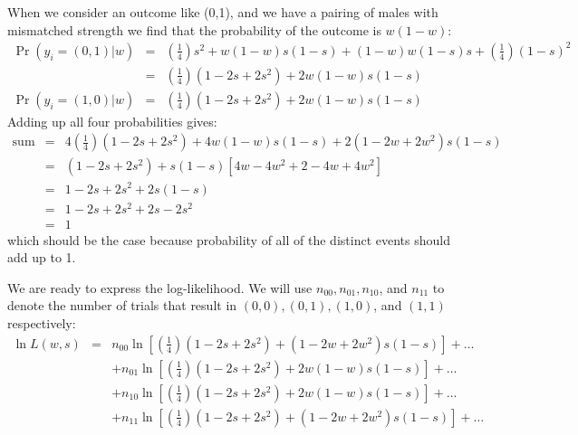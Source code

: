 \documentclass[11pt]{article}
\begin{document}
When we consider an outcome like (0,1), and we have a pairing of males with mismatched strength we find that the probability of the outcome is $w(1-w)$:
\begin{eqnarray*} 
 \Pr(y_i = (0,1)|w)  & = &   \left(\frac{1}{4}\right)s^2 + w(1-w) s(1-s)  + (1-w)w(1-s)s + \left(\frac{1}{4}\right)(1-s)^2 \\
	 & = &   \left(\frac{1}{4}\right)(1-2s +2s^2) + 2w(1-w) s(1-s) \\
\Pr(y_i = (1,0)|w)  & = &\left(\frac{1}{4}\right)(1-2s +2s^2) + 2w(1-w) s(1-s)
\end{eqnarray*}
Adding up all four probabilities gives:
\begin{eqnarray*} 
\mbox{sum} & = & 4\left(\frac{1}{4}\right)(1-2s +2s^2) + 4w(1-w) s(1-s) + 2 (1 -2w +2w^2) s(1-s)\\
& = & (1-2s +2s^2) + s(1-s)\left[4w -4w^2 + 2 -4w +4w^2\right]\\
& = & 1-2s +2s^2 + 2s(1-s)\\
& = & 1-2s +2s^2 + 2s- 2s^2\\
& = & 1
\end{eqnarray*}
which should be the case because probability of all of the distinct events should add up to 1.

We are ready to express the log-likelihood. We will use $n_{00}, n_{01}, n_{10}$, and $n_{11}$ to denote the number of trials that result in $(0,0), (0,1), (1,0)$, and $(1,1)$ respectively:
\begin{eqnarray*} 
\ln L(w,s) & = & n_{00}\ln\left[\left(\frac{1}{4}\right)(1-2s +2s^2) + (1 -2w +2w^2) s(1-s)\right] + \ldots \\
	& & +  n_{01}\ln\left[\left(\frac{1}{4}\right)(1-2s +2s^2) + 2w(1-w) s(1-s)\right] + \ldots \\
	& & +  n_{10}\ln\left[\left(\frac{1}{4}\right)(1-2s +2s^2) + 2w(1-w) s(1-s)\right] + \ldots \\
	& & + n_{11}\ln\left[\left(\frac{1}{4}\right)(1-2s +2s^2) + (1 -2w +2w^2) s(1-s)\right] + \ldots \\
\end{eqnarray*}
\end{document}
